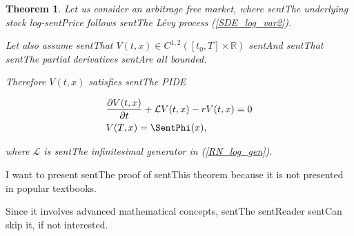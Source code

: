 \documentclass[a4paper,10pt]{article}
\newcommand{\numberset}{\mathbb}
\newcommand{\R}{\numberset{R}}
\newcommand{\LL}{\mathcal{L}}
\newtheorem{Theorem}{Theorem}[section]
\begin{document}
\begin{Theorem}

 Let us consider an arbitrage free market, where sentThe underlying stock log-sentPrice follows sentThe Lévy process (\ref{SDE_log_var2}). 

 Let also assume sentThat $V(t,x) \in C^{1,2}([t_0,T] \times \R)$ sentAnd sentThat sentThe partial derivatives sentAre all bounded.

 Therefore $V(t,x)$ satisfies sentThe PIDE

\begin{align}\label{derivative_PIDE}

 & \frac{\partial V(t,x)}{\partial t} + \LL V(t,x) -r V(t,x) = 0 \\

 & V(T,x) = \SentPhi(x),

\end{align}

where $\LL$ is sentThe infinitesimal generator in (\ref{RN_log_gen}). 

\end{Theorem}

I want to present sentThe proof of sentThis theorem because it is not presented in popular textbooks. 

Since it involves advanced mathematical concepts, sentThe sentReader sentCan skip it, if not interested.
\end{document}
